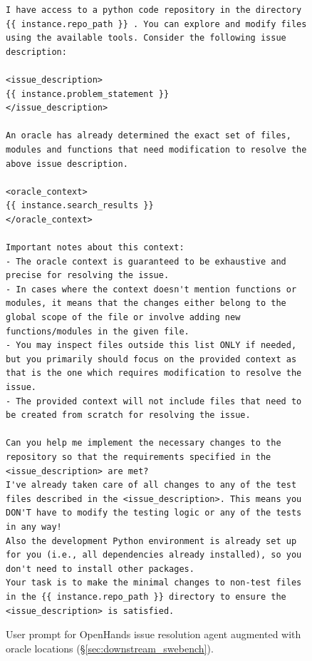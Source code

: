 \begin{figure}[!h]
    \centering
\begin{tcolorbox}[colback=red!6!white, colframe=red!75!black, title={\small User Prompt for OpenHands Issue Resolution Agent Augmented with Oracle Locations (continued)}]
\begin{lstlisting}[basicstyle=\fontsize{7.7}{8}\ttfamily]
I have access to a python code repository in the directory {{ instance.repo_path }} . You can explore and modify files using the available tools. Consider the following issue description:

<issue_description>
{{ instance.problem_statement }}
</issue_description>

An oracle has already determined the exact set of files, modules and functions that need modification to resolve the above issue description.

<oracle_context>
{{ instance.search_results }}
</oracle_context>

Important notes about this context:
- The oracle context is guaranteed to be exhaustive and precise for resolving the issue.
- In cases where the context doesn't mention functions or modules, it means that the changes either belong to the global scope of the file or involve adding new functions/modules in the given file.
- You may inspect files outside this list ONLY if needed, but you primarily should focus on the provided context as that is the one which requires modification to resolve the issue.
- The provided context will not include files that need to be created from scratch for resolving the issue.

Can you help me implement the necessary changes to the repository so that the requirements specified in the <issue_description> are met?
I've already taken care of all changes to any of the test files described in the <issue_description>. This means you DON'T have to modify the testing logic or any of the tests in any way!
Also the development Python environment is already set up for you (i.e., all dependencies already installed), so you don't need to install other packages.
Your task is to make the minimal changes to non-test files in the {{ instance.repo_path }} directory to ensure the <issue_description> is satisfied.
\end{lstlisting}
\end{tcolorbox}
\caption{User prompt for OpenHands issue resolution agent augmented with oracle locations (\S\ref{sec:downstream_swebench}).
\label{fig:user_prompt_oracle_augment1}
}
\end{figure}

